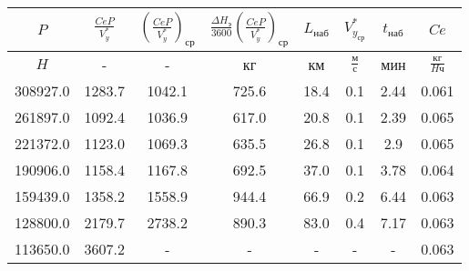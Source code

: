 \begin{tabular}{|c|c|c|c|c|c|c|c|}
\hline
$P$ & $\frac{CeP}{V_y^*}$ & $(\frac{CeP}{V_y^*})_{ср}$ & $\frac{\Delta H_э}{3600}(\frac{CeP}{V_y^*})_{ср}$ & $L_{наб}$ & $V_{y_{ср}}^*$ & $t_{наб}$ & $Ce$ \\ 
\hline
$H$ & - & - & кг & км & $\frac{м}{с}$ & мин & $\frac{кг}{H ч}$ \\ 
\hline
308927.0 & 1283.7 & 1042.1 & 725.6 & 18.4 & 0.1 & 2.44 & 0.061 \\ 
\hline
261897.0 & 1092.4 & 1036.9 & 617.0 & 20.8 & 0.1 & 2.39 & 0.065 \\ 
\hline
221372.0 & 1123.0 & 1069.3 & 635.5 & 26.8 & 0.1 & 2.9 & 0.065 \\ 
\hline
190906.0 & 1158.4 & 1167.8 & 692.5 & 37.0 & 0.1 & 3.78 & 0.064 \\ 
\hline
159439.0 & 1358.2 & 1558.9 & 944.4 & 66.9 & 0.2 & 6.44 & 0.063 \\ 
\hline
128800.0 & 2179.7 & 2738.2 & 890.3 & 83.0 & 0.4 & 7.17 & 0.063 \\ 
\hline
113650.0 & 3607.2 & - & - & - & - & - & 0.063 \\ 
\hline
\end{tabular}